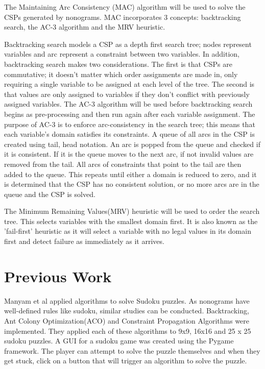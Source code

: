 \documentclass[12pt, letterpaper]
{article}
\begin{document}
    The Maintaining Arc Consistency (MAC) algorithm will be used to solve the CSPs generated by nonograms. MAC incorporates 3 concepts: backtracking search, the AC-3 algorithm and the MRV heuristic.

    Backtracking search models a CSP as a depth first search tree; nodes represent variables and arc represent a constraint between two variables. In addition, backtracking search makes two considerations. The first is that CSPs are commutative; it doesn't matter which order assignments are made in, only requiring a single variable to be assigned at each level of the tree. The second is that values are only assigned to variables if they don't conflict with previously assigned variables.
    The AC-3 algorithm will be used before backtracking search begins as pre-processing and then run again after each variable assignment. The purpose of AC-3 is to enforce arc-consistency in the search tree; this means that each variable's domain satisfies its constraints. A queue of all arcs in the CSP is created using tail, head notation. An arc is popped from the queue and checked if it is consistent. If it is the queue moves to the next arc, if not invalid values are removed from the tail. All arcs of constraints that point to the tail are then added to the queue. This repeats until either a domain is reduced to zero, and it is determined that the CSP has no consistent solution, or no more arcs are in the queue and the CSP is solved.

    The Minimum Remaining Values(MRV) heuristic will be used to order the search tree. This selects variables with the smallest domain first. It is also known as the 'fail-first' heuristic as it will select a variable with no legal values in its domain first and detect failure as immediately as it arrives. \cite{russell_artificial_2022}






\section{Previous Work}
    Manyam et al \cite{10863160} applied algorithms to solve Sudoku puzzles. As nonograms have well-defined rules like sudoku, similar studies can be conducted. Backtracking, Ant Colony Optimization(ACO) and Constraint Propagation Algorithms were implemented. They applied each of these algorithms to 9x9, 16x16 and 25 x 25 sudoku puzzles. A GUI for a sudoku game was created using the Pygame framework. The player can attempt to solve the puzzle themselves and when they get stuck, click on a button that will trigger an algorithm to solve the puzzle.
\end{document}
